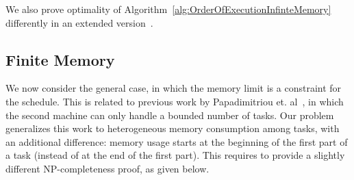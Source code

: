 \documentclass[sigconf]{acmart}
\begin{document}
	We also prove optimality of Algorithm~\ref{alg:OrderOfExecutionInfinteMemory} differently in an extended version~\cite{extendedVersion}.
	\subsection{Finite Memory}
	
	We now consider the general case, in which the memory limit is a
	constraint for the schedule. This is related to previous work by
	Papadimitriou et. al~\cite{Papadimitriou:1980:FSL:322203.322213}, in which the second machine
	can only handle a bounded number of tasks. Our problem generalizes this
	work to heterogeneous memory consumption among tasks, with an
	additional difference: memory usage starts at the beginning of the
	first part of a task (instead of at the end of the first part). This
	requires to provide a slightly different NP-completeness proof, as
	given below.
	
\end{document}

